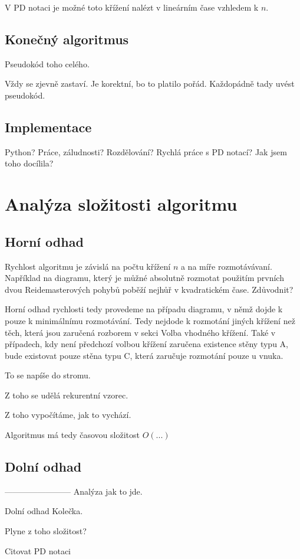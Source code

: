 V PD notaci je možné toto křížení nalézt v lineárním čase vzhledem k $n$.

\subsection{Konečný algoritmus}
Pseudokód toho celého. 

Vždy se zjevně zastaví. Je korektní, bo to platilo pořád.
Každopádně tady uvést pseudokód.

\subsection{Implementace}
Python?
Práce, záludnosti? Rozdělování?
Rychlá práce s PD notací? Jak jsem toho docílila?
\section{Analýza složitosti algoritmu}
\subsection{Horní odhad}
Rychlost algoritmu je závislá na počtu křížení $n$ a na míře rozmotávávaní. Například na diagramu, který je můžné absolutně rozmotat použitím prvních dvou Reidemasterových pohybů poběží nejhůř v kvadratickém čase. Zdůvodnit?

Horní odhad rychlosti tedy provedeme na případu diagramu, v němž dojde k pouze k minimálnímu rozmotávání. Tedy nejdode k rozmotání jiných křížení než těch, která jsou zaručená rozborem v sekci Volba vhodného křížení.
Také v případech, kdy není předchozí volbou křížení zaručena existence stěny typu A, bude existovat pouze stěna typu C, která zaručuje rozmotání pouze u vnuka.


To se napíše do stromu.

Z toho se udělá rekurentní vzorec.

Z toho vypočítáme, jak to vychází.

Algoritmus má tedy časovou složitost $O(...)$

\subsection{Dolní odhad}
------------------------
Analýza jak to jde.

Dolní odhad
Kolečka.

Plyne z toho složitost?

Citovat PD notaci